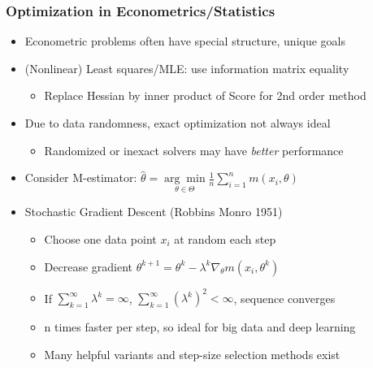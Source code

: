 \documentclass[bigger]{beamer}
\begin{document}
\begin{frame}%

\frametitle{Optimization in Econometrics/Statistics}

\begin{itemize}

\item Econometric problems often have special structure, unique goals
\item (Nonlinear) Least squares/MLE: use information matrix equality
\begin{itemize}
\item Replace Hessian by inner product of Score for 2nd order method
\end{itemize}
\item Due to data randomness, exact optimization not always ideal
\begin{itemize}
\item Randomized or inexact solvers may have \emph{better} performance
\end{itemize}
\item Consider M-estimator: $\hat{\theta}=\underset{\theta\in\Theta}{\arg\min}\frac{1}{n}\sum_{i=1}^{n}m(x_i,\theta)$
\item Stochastic Gradient Descent (Robbins Monro 1951)

\begin{itemize}
\item Choose one data point $x_i$ at random each step
\item Decrease gradient $\theta^{k+1}=\theta^{k}-\lambda^{k}\nabla_\theta m(x_i,\theta^k)$
\item If $\sum_{k=1}^{\infty}\lambda^{k}=\infty$,  $\sum_{k=1}^{\infty}(\lambda^{k})^{2}<\infty$, sequence converges
\item n times faster per step, so ideal for big data and deep learning
\item Many helpful variants and step-size selection methods exist
\end{itemize}




\end{itemize}

\end{frame}
\end{document}
